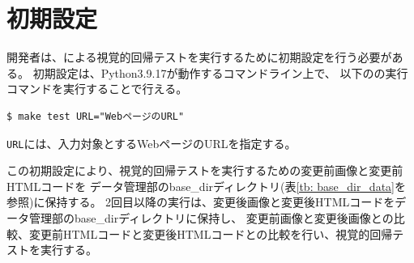 \section{初期設定}\label{subsec:MixVRT_preparation}
開発者は、\toolName による視覚的回帰テストを実行するために初期設定を行う必要がある。
初期設定は、Python3.9.17\cite{Python}が動作するコマンドライン上で、
以下の\toolName の実行コマンドを実行することで行える。
\begin{lstlisting}[label=list:command,frame=none,numbers=none,basicstyle={\normalsize \ttfamily \color[gray]{.15}}]
  $ make test URL="WebページのURL"
 \end{lstlisting}
{\tt URL}には、入力対象とするWebページのURLを指定する。
\par
この初期設定により、視覚的回帰テストを実行するための変更前画像と変更前HTMLコードを
データ管理部のbase\_dirディレクトリ(表\ref{tb: base_dir_data}を参照)に保持する。
2回目以降の実行は、変更後画像と変更後HTMLコードをデータ管理部のbase\_dirディレクトリに保持し、
変更前画像と変更後画像との比較、変更前HTMLコードと変更後HTMLコードとの比較を行い、視覚的回帰テストを実行する。

